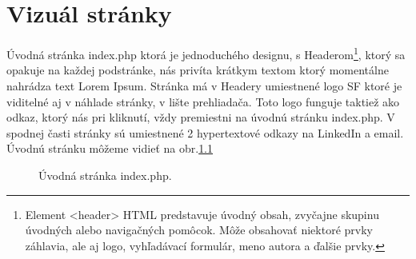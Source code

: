 \chapter{Vizuál stránky}


Úvodná stránka index.php ktorá je jednoduchého designu, s Headerom\footnote[1]{Element <header> HTML predstavuje úvodný obsah, zvyčajne skupinu úvodných alebo navigačných pomôcok. Môže obsahovať niektoré prvky záhlavia, ale aj logo, vyhľadávací formulár, meno autora a ďalšie prvky.}, ktorý sa opakuje na každej podstránke, nás privíta krátkym textom ktorý momentálne nahrádza text Lorem Ipsum. Stránka má v Headery umiestnené logo SF ktoré je viditelné aj v náhlade stránky, v lište prehliadača. Toto logo funguje taktiež ako odkaz, ktorý nás pri kliknutí, vždy premiestni na úvodnú stránku index.php. V spodnej časti stránky sú umiestnené 2 hypertextové odkazy na LinkedIn a email. Úvodnú stránku môžeme vidieť na obr.\ref{OBRAZOK 1.1}

\begin{figure}[!tbh]
\centering
\setlength{\fboxsep}{0pt}%
\setlength{\fboxrule}{1pt}%
\caption{Úvodná stránka index.php.}\label{OBRAZOK 1.1}
\end{figure}






